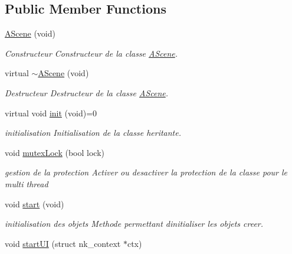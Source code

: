 \subsection*{Public Member Functions}
\begin{DoxyCompactItemize}
\item 
\mbox{\hyperlink{class_beer_engine_1_1_a_scene_a811f775c81c6d46b267e1926450a7c32}{A\+Scene}} (void)
\begin{DoxyCompactList}\small\item\em Constructeur Constructeur de la classe \mbox{\hyperlink{class_beer_engine_1_1_a_scene}{A\+Scene}}. \end{DoxyCompactList}\item 
virtual \mbox{\hyperlink{class_beer_engine_1_1_a_scene_abaa7995756d22d36008d4b541b6b20ca}{$\sim$\+A\+Scene}} (void)
\begin{DoxyCompactList}\small\item\em Destructeur Destructeur de la classe \mbox{\hyperlink{class_beer_engine_1_1_a_scene}{A\+Scene}}. \end{DoxyCompactList}\item 
virtual void \mbox{\hyperlink{class_beer_engine_1_1_a_scene_a7a55b4e506ae618e6596ae812ad48db0}{init}} (void)=0
\begin{DoxyCompactList}\small\item\em initialisation Initialisation de la classe heritante. \end{DoxyCompactList}\item 
void \mbox{\hyperlink{class_beer_engine_1_1_a_scene_a5c1cc3e869d48b92331fe606eb86497c}{mutex\+Lock}} (bool lock)
\begin{DoxyCompactList}\small\item\em gestion de la protection Activer ou desactiver la protection de la classe pour le multi thread \end{DoxyCompactList}\item 
void \mbox{\hyperlink{class_beer_engine_1_1_a_scene_a332808581c9141259a6acdc2fa8e0e5c}{start}} (void)
\begin{DoxyCompactList}\small\item\em initialisation des objets Methode permettant d\textquotesingle{}initialiser les objets creer. \end{DoxyCompactList}\item 
void \mbox{\hyperlink{class_beer_engine_1_1_a_scene_a444a7a1321f9c8c14a2d3821f649c85e}{start\+UI}} (struct nk\+\_\+context $\ast$ctx)
\item 

\end{DoxyCompactItemize}
